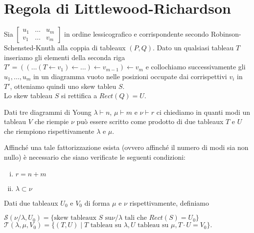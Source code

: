 \chapter{Regola di Littlewood-Richardson}

\begin{prop}
Sia
\begin{math}
\begin{bmatrix}
u_1 & \ldots & u_m\\
v_1 & \ldots & v_m
\end{bmatrix}
\end{math}
in ordine lessicografico e corrispondente secondo
Robinson-Schensted-Knuth alla coppia di tableaux $(P,Q)$. Dato un
qualsiasi tableau $T$ inseriamo gli elementi della seconda riga
$T' = ((\ldots (T \gets v_1) \gets \ldots ) \gets v_{m-1} ) \gets v_m$ e
collochiamo successivamente gli $u_1, \ldots, u_m$ in un diagramma
vuoto nelle posizioni occupate dai corrispettivi $v_i$ in $T'$,
otteniamo quindi uno skew tableu $S$.\\
Lo skew tableau $S$ si rettifica a $Rect(Q)=U$.
\end{prop}

Dati tre diagrammi di Young $\lambda \vdash n$, $\mu \vdash m$ e $\nu
\vdash r$ ci chiediamo in quanti modi un tableau $V$ che riempie
$\nu$ pu\`o essere scritto come prodotto di due tableaux $T$ e $U$
che riempiono rispettivamente $\lambda$ e $\mu$.

\begin{oss}
Affinch\'e una tale fattorizzazione esista (ovvero affinch\'e il numero
di modi sia non nullo) \`e necessario che siano verificate le seguenti
condizioni:
\begin{enumerate}[(i)]
\item $r = n + m$
\item $\lambda \subset \nu$
\end{enumerate}
\end{oss}

\begin{defn}
Dati due tableaux $U_0$ e $V_0$ di forma $\mu$ e $\nu$
rispettivamente, definiamo
\begin{center}\begin{math}
\mathcal{S}(\nu/\lambda, U_0) = \{\text{skew tableaux } S \text{ su
}\nu/\lambda \text{ tali che } Rect(S) =U_0\}
\end{math}\\
\begin{math}
\mathcal{T}(\lambda, \mu, V_0)=\{(T,U) \mid T \text{ tableau su }
\lambda, U \text{ tableau su } \mu, T\cdot U=V_0\}.
\end{math}\end{center}
\end{defn}

